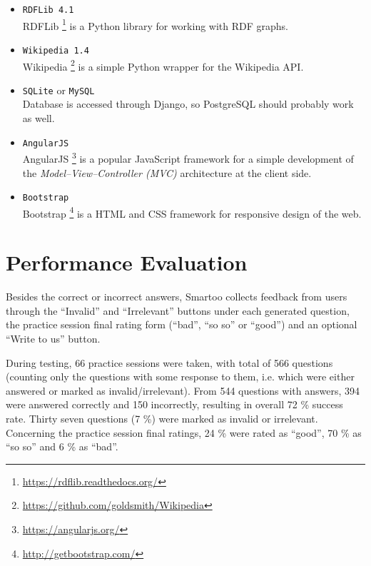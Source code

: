 \documentclass[12pt, twoside]{fithesis2}
\renewcommand{\_}{\leavevmode \kern0.07em\vbox{\hrule width0.4em}}
\newcommand{\squarebullet}{\textcolor{black}{\raisebox{0.15em}{\rule{4pt}{4pt}}}}
\newcommand{\emptysquarebullet}{\textcolor{black}{\raisebox{0.10em}{\tiny$\square$}}}
\newenvironment{myItemize}{
  \begin{itemize}[leftmargin=2em,rightmargin=1em,itemsep=\parskip ,parsep=0em,topsep=0em,partopsep=0em]
  \renewcommand{\labelitemi}{\squarebullet}
  \renewcommand{\labelitemii}{\textbullet}
}{
  \end{itemize}
}
\begin{document}
\begin{myItemize}
\item \texttt{RDFLib 4.1}\\
RDFLib%
\footnote{\url{https://rdflib.readthedocs.org/}}
is a Python library for working with RDF graphs.

\item \texttt{Wikipedia 1.4}\\
Wikipedia%
\footnote{\url{https://github.com/goldsmith/Wikipedia}}
is a simple Python wrapper for the Wikipedia API.

\item \texttt{SQLite} or \texttt{MySQL}\\
Database is accessed through Django,
so PostgreSQL should probably work as well.

\item \texttt{AngularJS}\\
AngularJS%
\footnote{\url{https://angularjs.org/}}
is a popular JavaScript framework for a simple development of the \emph{Model--View--Controller (MVC)} architecture at the client side.

\item \texttt{Bootstrap}\\
Bootstrap%
\footnote{\url{http://getbootstrap.com/}}
is a HTML and CSS framework for responsive design of the web.
\end{myItemize}





\section{Performance Evaluation}
\label{sec:performance-evaluation}

Besides the correct or incorrect answers, Smartoo collects feedback from users through
the ``Invalid'' and ``Irrelevant'' buttons under each generated question,
the practice session final rating form (``bad'', ``so so'' or ``good'')
and an optional ``Write to us'' button.

During testing, 66 practice sessions were taken, with total of 566 questions
(counting only the questions with some response to them, i.e. which were either answered or marked as invalid/irrelevant).
From 544 questions with answers, 394 were answered correctly and 150 incorrectly,
resulting in overall 72 \% success rate.
Thirty seven questions (7 \%) were marked as invalid or irrelevant.
Concerning the practice session final ratings, 24 \% were rated as ``good'', 70 \% as ``so so'' and 6 \% as ``bad''.
\end{document}
